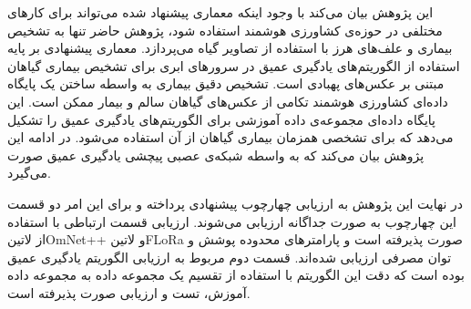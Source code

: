 این پژوهش بیان می‌کند با وجود اینکه معماری پیشنهاد شده می‌تواند برای کارهای مختلفی در حوزه‌ی کشاورزی هوشمند استفاده شود، پژوهش حاضر تنها به تشخیص بیماری و علف‌های هرز
با استفاده از تصاویر گیاه می‌پردازد.
معماری پیشنهادی بر پایه استفاده از الگوریتم‌های یادگیری عمیق در سرورهای ابری برای تشخیص بیماری گیاهان مبتنی بر عکس‌های پهبادی است.
تشخیص دقیق بیماری به واسطه ساختن یک پایگاه داده‌ای کشاورزی هوشمند تکامی از عکس‌های گیاهان سالم و بیمار ممکن است.
این پایگاه داده‌ای مجموعه‌ی داده‌ آموزشی برای الگوریتم‌های یادگیری عمیق را تشکیل می‌دهد که برای تشخصی همزمان بیماری گیاهان از آن استفاده می‌شود.
در ادامه این پژوهش بیان می‌کند که به واسطه شبکه‌ی عصبی پیچشی یادگیری عمیق صورت می‌گیرد.

در نهایت این پژوهش به ارزیابی چهارچوب پیشنهادی پرداخته و برای این امر دو قسمت این چهارچوب به صورت جداگانه ارزیابی می‌شوند.
ارزیابی قسمت ارتباطی با استفاده از ‌لاتین{OmNet++} و ‌لاتین{FLoRa} صورت پذیرفته است و پارامترهای محدوده پوشش و توان مصرفی ارزیابی شده‌اند.
قسمت دوم مربوط به ارزیابی الگوریتم یادگیری عمیق بوده است که دقت این الگوریتم با استفاده از تقسیم یک مجموعه داده به مجموعه داده آموزش، تست و ارزیابی
صورت پذیرفته است.
